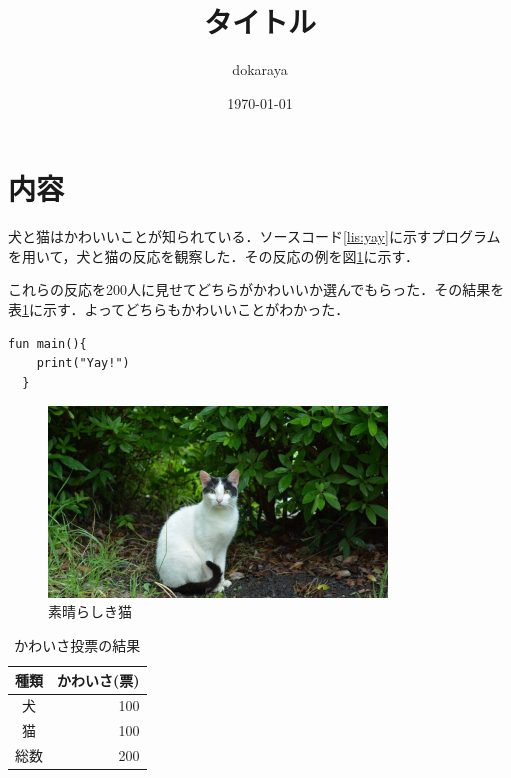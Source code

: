 \documentclass[a4j,10pt]{jarticle}
\title{タイトル}
\author{dokaraya}
\date{\today}
\begin{document}
	\maketitle
  \section{内容}
  犬と猫はかわいいことが知られている\cite{test}．ソースコード\ref{lis:yay}に示すプログラムを用いて，犬と猫の反応を観察した．その反応の例を図\ref{fig:cat}に示す．\par
  これらの反応を200人に見せてどちらがかわいいか選んでもらった．その結果を表\ref{tab:example}に示す．よってどちらもかわいいことがわかった．

  \begin{lstlisting}[caption = Yayするプログラム, label = lis:yay]
  fun main(){
    print("Yay!")
  }
  \end{lstlisting}

  \begin{figure}
    \centering
    \includegraphics[width=9cm]{fig/img.jpg}
    \caption{素晴らしき猫}
    \label{fig:cat}
  \end{figure}

  \begin{table}[t]
    \caption{かわいさ投票の結果}
    \label{tab:example}
    \centering
    \begin{tabular}{cr}
      \hline
      種類 & かわいさ(票)\\ \hline
      犬 & 100\\
      猫 & 100\\ \hline
      総数 & 200 \\ \hline
    \end{tabular}
  \end{table}



\end{document}
